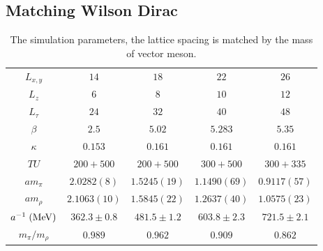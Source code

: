 \subsection{\label{matchingWD}Matching Wilson Dirac}

\begin{table}[!htbp]
\begin{center}
\begin{tabular}{c|c|c|c|c}
\hline
$L_{x,y}$ & $14$ & $18$ & $22$ & $26$\\
$L_z$ & $6$ & $8$ & $10$ & $12$\\
$L_{\tau}$ & $24$ & $32$ & $40$ & $48$\\
$\beta$ & $2.5$ & $5.02$ & $5.283$ & $5.35$ \\
$\kappa$ & $0.153$ & $0.161$ & $0.161$ & $0.161$ \\
$TU$ & $200+500$ & $200+500$ & $300+500$ & $300+335$ \\
$am_{\pi}$ & $2.0282(8)$ & $1.5245(19)$ & $1.1490(69)$ & $0.9117(57)$ \\
$am_{\rho}$ & $2.1063(10)$ & $1.5845(22)$ & $1.2637(40)$ & $1.0575(23)$ \\
$a^{-1}\;({\rm MeV})$ & $362.3 \pm 0.8$ & $481.5 \pm 1.2$ & $603.8 \pm 2.3$ & $721.5 \pm 2.1$ \\
$m_{\pi}/m_{\rho}$ & $0.989$ & $0.962$ & $0.909$ & $0.862$ \\
\hline
\end{tabular}
\end{center}
\caption{\label{tab:matchingwd1}The simulation parameters, the lattice spacing is matched by the mass of vector meson. }
\end{table}

